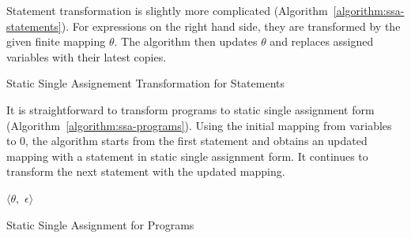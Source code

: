 Statement transformation is slightly more complicated
(Algorithm~\ref{algorithm:ssa-statements}). For 
expressions on the right hand side, they are transformed by the given
finite mapping $\theta$. The algorithm then updates $\theta$ and
replaces assigned variables with their latest copies. 

\begin{algorithm}
  \begin{algorithmic}[1]
      \EndCase
      \EndCase
    \EndMatch
    \EndFunction
  \end{algorithmic}
  \caption{Static Single Assignement Transformation for Statements}
  \label{algorithm:ssa-statements}
\end{algorithm}

It is straightforward to transform programs to static single
assignment form (Algorithm~\ref{algorithm:ssa-programs}). Using the
initial mapping from variables to $0$, 
the algorithm starts from the first statement and obtains an
updated mapping with a statement in static single assignment form. It
continues to transform the next statement with the updated mapping. 

\begin{algorithm}
  \begin{algorithmic}[1]
      \Case{$\epsilon$}
        \Return $\langle \theta,$ $\epsilon \rangle$
      \EndCase
      \EndCase
    \EndMatch
    \EndFunction
  \end{algorithmic}
  \caption{Static Single Assignment for Programs}
  \label{algorithm:ssa-programs}
\end{algorithm}


